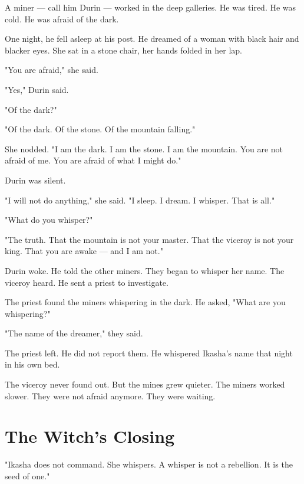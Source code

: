 \documentclass[10pt,twoside]{book}
\begin{document}
A miner --- call him Durin --- worked in the deep galleries. He was tired. He was cold. He was afraid of the dark.

One night, he fell asleep at his post. He dreamed of a woman with black hair and blacker eyes. She sat in a stone chair, her hands folded in her lap.

"You are afraid," she said.

"Yes," Durin said.

"Of the dark?"

"Of the dark. Of the stone. Of the mountain falling."

She nodded. "I am the dark. I am the stone. I am the mountain. You are not afraid of me. You are afraid of what I might do."

Durin was silent.

"I will not do anything," she said. "I sleep. I dream. I whisper. That is all."

"What do you whisper?"

"The truth. That the mountain is not your master. That the viceroy is not your king. That you are awake --- and I am not."

Durin woke. He told the other miners. They began to whisper her name. The viceroy heard. He sent a priest to investigate.

The priest found the miners whispering in the dark. He asked, "What are you whispering?"

"The name of the dreamer," they said.

The priest left. He did not report them. He whispered Ikasha's name that night in his own bed.

The viceroy never found out. But the mines grew quieter. The miners worked slower. They were not afraid anymore. They were waiting.

\section*{The Witch's Closing}
"Ikasha does not command. She whispers. A whisper is not a rebellion. It is the seed of one."
\end{document}
